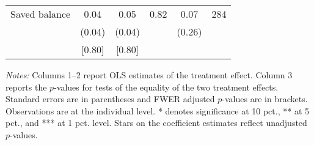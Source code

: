\begin{table}[ht]
{\begin{threeparttable}
\begin{tabular}{l*{5}{c}}
Saved balance&     0.04&     0.05&     0.82&     0.07&      284\\
          &   (0.04)&   (0.04)&         &   (0.26)&         \\
          &   [0.80]&   [0.80]&         &         &         \\
\bottomrule \end{tabular} \begin{tablenotes}[flushleft] \footnotesize \item \emph{Notes:} Columns 1--2 report OLS estimates of the treatment effect. Column 3 reports the \(p\)-values for tests of the equality of the two treatment effects. Standard errors are in parentheses and FWER adjusted \(p\)-values are in brackets. Observations are at the individual level. * denotes significance at 10 pct., ** at 5 pct., and *** at 1 pct. level. Stars on the coefficient estimates reflect unadjusted \(p\)-values. \end{tablenotes} \end{threeparttable} } \end{table}

